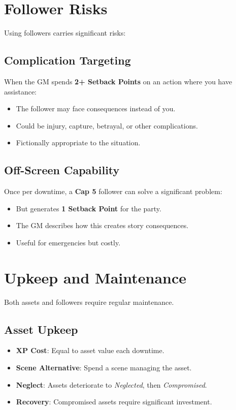 \begin{multicols}{2}
\section{Follower Risks}

Using followers carries significant risks:

\subsection*{Complication Targeting}
When the GM spends \textbf{2+ Setback Points} on an action where you have assistance:
\begin{itemize}
\item The follower may face consequences instead of you.
\item Could be injury, capture, betrayal, or other complications.
\item Fictionally appropriate to the situation.
\end{itemize}

\subsection*{Off-Screen Capability}
Once per downtime, a \textbf{Cap 5} follower can solve a significant problem:
\begin{itemize}
\item But generates \textbf{1 Setback Point} for the party.
\item The GM describes how this creates story consequences.
\item Useful for emergencies but costly.
\end{itemize}

\section{Upkeep and Maintenance}

Both assets and followers require regular maintenance.

\subsection*{Asset Upkeep}
\begin{itemize}
\item \textbf{XP Cost}: Equal to asset value each downtime.
\item \textbf{Scene Alternative}: Spend a scene managing the asset.
\item \textbf{Neglect}: Assets deteriorate to \emph{Neglected}, then \emph{Compromised}.
\item \textbf{Recovery}: Compromised assets require significant investment.
\end{itemize}


\end{multicols}
